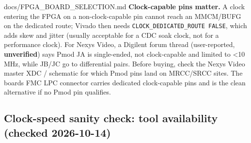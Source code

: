 \begin{relocated}{docs/FPGA_BOARD_SELECTION.md}
\textbf{Clock-capable pins matter.} A clock entering the FPGA on a
non-clock-capable pin cannot reach an MMCM/BUFG on the dedicated route;
Vivado then needs
\texttt{CLOCK\_\allowbreak{}DEDICATED\_\allowbreak{}ROUTE\ FALSE}, which
adds skew and jitter (usually acceptable for a CDC soak clock, not for a
performance clock). For Nexys Video, a Digilent forum thread
(user-reported, \textbf{unverified}) says Pmod JA is single-ended, not
clock-capable and limited to \textless10 MHz, while JB/JC go to
differential pairs. Before buying, check the Nexys Video master XDC /
schematic for which Pmod pins land on MRCC/SRCC sites. The
board\textquotesingle s FMC LPC connector carries dedicated
clock-capable  pins and is the clean alternative if no
Pmod pin qualifies.

\subsection{Clock-speed sanity check: tool availability (checked
2026-10-14)}\label{tm:dec:fpga-board-selection:5-clock-speed-sanity-check-tool-availability-checked-2026-10-14}

{\footnotesize\setlength{\tabcolsep}{3pt}

}
\end{relocated}
